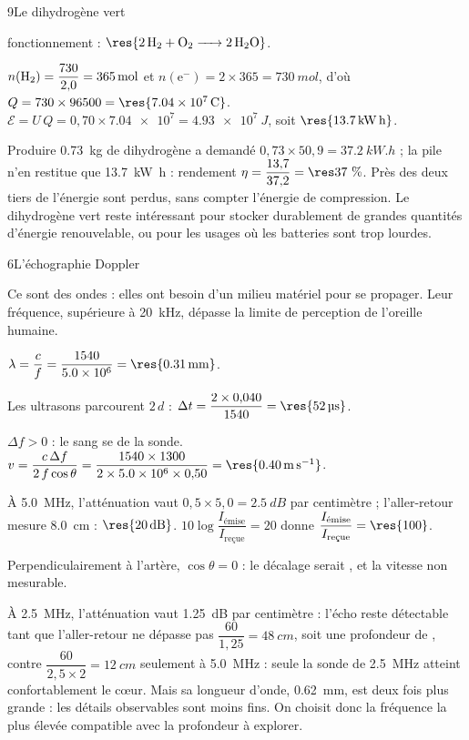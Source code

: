 \begin{corrigeBac}{9}{Le dihydrogène vert}
\begin{questions}[resume]
fonctionnement : $\res{\ce{2H2 + O2 -> 2H2O}}$. 
\item $n(\ce{H2})=\dfrac{730}{2{,}0}=\qty{365}{mol}$ et $n(\mathrm{e}^-)=2\times365=\qty{730}{mol}$, d'où $Q=730\times96500=\res{\qty{7,04e7}{C}}$.
$\mathcal{E}=U\,Q=0{,}70\times\num{7.04e7}=\qty{4,93e7}{J}$, soit $\res{\qty{13,7}{kW.h}}$. \pts{1 pt}
\item Produire \qty{0,73}{kg} de dihydrogène a demandé $0{,}73\times50{,}9=\qty{37,2}{kW.h}$ ; la pile n'en restitue que \qty{13,7}{kW.h} :
rendement $\eta=\dfrac{13{,}7}{37{,}2}=\res{37~\%}$. Près des deux tiers de l'énergie sont perdus, sans compter l'énergie de
compression. Le dihydrogène vert reste intéressant pour stocker durablement de grandes quantités d'énergie
renouvelable, ou pour les usages où les batteries sont trop lourdes. 
\end{questions}
\end{corrigeBac}

\begin{corrigeBac}{6}{L'échographie Doppler}
\begin{questions}
\item Ce sont des ondes  : elles ont besoin d'un milieu matériel pour se propager. Leur fréquence,
supérieure à \qty{20}{kHz}, dépasse la limite de perception de l'oreille humaine. 
\item $\lambda=\dfrac{c}{f}=\dfrac{1540}{\num{5.0e6}}=\res{\qty{0,31}{mm}}$. 
\item Les ultrasons parcourent $2\,d$ : $\Delta t=\dfrac{2\times0{,}040}{1540}=\res{\qty{52}{\micro s}}$. 
\item $\Delta f>0$ : le sang se  de la sonde. $v=\dfrac{c\,\Delta f}{2\,f\cos\theta}=\dfrac{1540\times1300}{2\times\num{5.0e6}\times0{,}50}=\res{\qty{0,40}{m.s^{-1}}}$. 
\item À \qty{5,0}{MHz}, l'atténuation vaut $0{,}5\times5{,}0=\qty{2,5}{dB}$ par centimètre ; l'aller-retour mesure \qty{8,0}{cm} :
$\res{\qty{20}{dB}}$. $10\log\dfrac{I_\text{émise}}{I_\text{reçue}}=20$ donne $\dfrac{I_\text{émise}}{I_\text{reçue}}=\res{100}$. \pts{1 pt}
\item Perpendiculairement à l'artère, $\cos\theta=0$ : le décalage serait , et la vitesse non mesurable. 
\item À \qty{2,5}{MHz}, l'atténuation vaut \qty{1,25}{dB} par centimètre : l'écho reste détectable tant que l'aller-retour ne dépasse
pas $\dfrac{60}{1{,}25}=\qty{48}{cm}$, soit une profondeur de , contre $\dfrac{60}{2{,}5\times2}=\qty{12}{cm}$ seulement à \qty{5,0}{MHz} :
seule la sonde de \qty{2,5}{MHz} atteint confortablement le cœur. Mais sa longueur d'onde, \qty{0,62}{mm}, est deux fois plus
grande : les détails observables sont moins fins. On choisit donc la fréquence la plus élevée compatible avec la
profondeur à explorer. 
\end{questions}
\end{corrigeBac}


